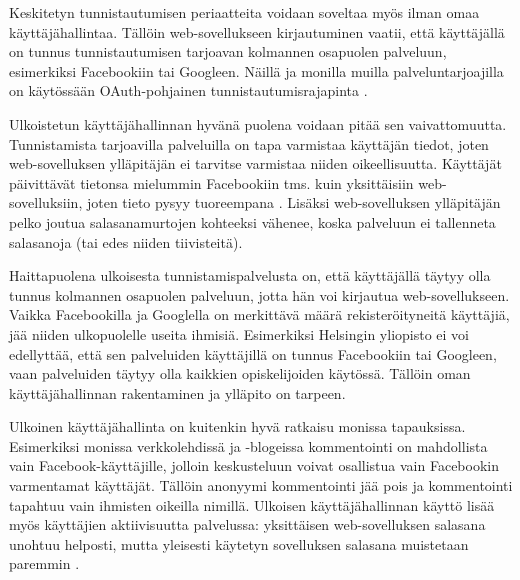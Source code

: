 Keskitetyn tunnistautumisen periaatteita voidaan soveltaa myös ilman omaa käyttäjähallintaa. Tällöin web-sovellukseen kirjautuminen vaatii, että käyttäjällä on tunnus tunnistautumisen tarjoavan kolmannen osapuolen palveluun, esimerkiksi Facebookiin tai Googleen. Näillä ja monilla muilla palveluntarjoajilla on käytössään OAuth-pohjainen tunnistautumisrajapinta \cite{inside_the_identity_management_game}.

Ulkoistetun käyttäjähallinnan hyvänä puolena voidaan pitää sen vaivattomuutta. Tunnistamista tarjoavilla palveluilla on tapa varmistaa käyttäjän tiedot, joten web-sovelluksen ylläpitäjän ei tarvitse varmistaa niiden oikeellisuutta. Käyttäjät päivittävät tietonsa mielummin Facebookiin tms. kuin yksittäisiin web-sovelluksiin, joten tieto pysyy tuoreempana \cite{inside_the_identity_management_game}. Lisäksi web-sovelluksen ylläpitäjän pelko joutua salasanamurtojen kohteeksi vähenee, koska palveluun ei tallenneta salasanoja (tai edes niiden tiivisteitä).

Haittapuolena ulkoisesta tunnistamispalvelusta on, että käyttäjällä täytyy olla tunnus kolmannen osapuolen palveluun, jotta hän voi kirjautua web-sovellukseen. Vaikka Facebookilla ja Googlella on merkittävä määrä rekisteröityneitä käyttäjiä, jää niiden ulkopuolelle useita ihmisiä. Esimerkiksi Helsingin yliopisto ei voi edellyttää, että sen palveluiden käyttäjillä on tunnus Facebookiin tai Googleen, vaan palveluiden täytyy olla kaikkien opiskelijoiden käytössä. Tällöin oman käyttäjähallinnan rakentaminen ja ylläpito on tarpeen.

Ulkoinen käyttäjähallinta on kuitenkin hyvä ratkaisu monissa tapauksissa. Esimerkiksi monissa verkkolehdissä ja -blogeissa kommentointi on mahdollista vain Fa\-ce\-book-käyt\-tä\-jil\-le, jolloin keskusteluun voivat osallistua vain Facebookin varmentamat käyttäjät. Tällöin anonyymi kommentointi jää pois ja kommentointi tapahtuu vain ihmisten oikeilla nimillä. Ulkoisen käyttäjähallinnan käyttö lisää myös käyttäjien aktiivisuutta palvelussa: yksittäisen web-sovelluksen salasana unohtuu helposti, mutta yleisesti käytetyn sovelluksen salasana muistetaan paremmin \cite{password_habits}.